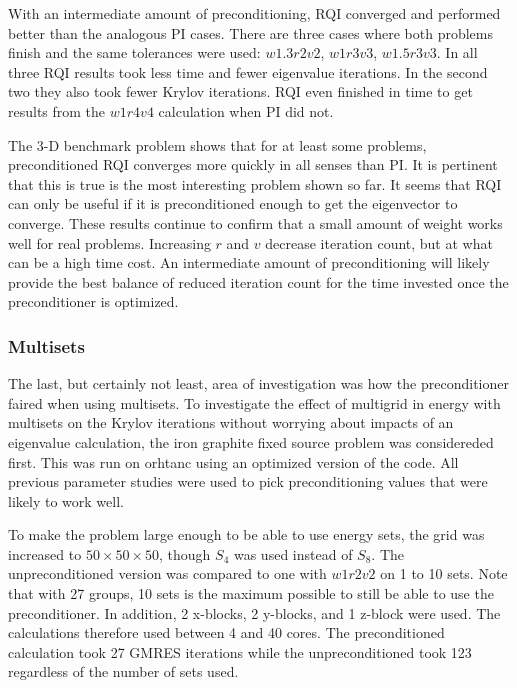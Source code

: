 With an intermediate amount of preconditioning, RQI converged and performed better than the analogous PI cases. There are three cases where both problems finish and the same tolerances were used: $w1.3r2v2$, $w1r3v3$, $w1.5r3v3$. In all three RQI results took less time and fewer eigenvalue iterations. In the second two they also took fewer Krylov iterations. RQI even finished in time to get results from the $w1r4v4$ calculation when PI did not. 

The 3-D benchmark problem shows that for at least some problems, preconditioned RQI converges more quickly in all senses than PI. It is pertinent that this is true is the most interesting problem shown so far. It seems that RQI can only be useful if it is preconditioned enough to get the eigenvector to converge. These results continue to confirm that a small amount of weight works well for real problems. Increasing $r$ and $v$ decrease iteration count, but at what can be a high time cost. An intermediate amount of preconditioning will likely provide the best balance of reduced iteration count for the time invested once the preconditioner is optimized. 

\subsubsection{Multisets}
The last, but certainly not least, area of investigation was how the preconditioner faired when using multisets. To investigate the effect of multigrid in energy with multisets on the Krylov iterations without worrying about impacts of an eigenvalue calculation, the iron graphite fixed source problem was considereded first. This was run on orhtanc using an optimized version of the code. All previous parameter studies were used to pick preconditioning values that were likely to work well. 

To make the problem large enough to be able to use energy sets, the grid was increased to $50 \times 50 \times 50$, though $S_{4}$ was used instead of $S_{8}$. The unpreconditioned version was compared to one with $w1r2v2$ on 1 to 10 sets. Note that with 27 groups, 10 sets is the maximum possible to still be able to use the preconditioner. In addition, 2 x-blocks, 2 y-blocks, and 1 z-block were used. The calculations therefore used between 4 and 40 cores. The preconditioned calculation took 27 GMRES iterations while the unpreconditioned took 123 regardless of the number of sets used.

